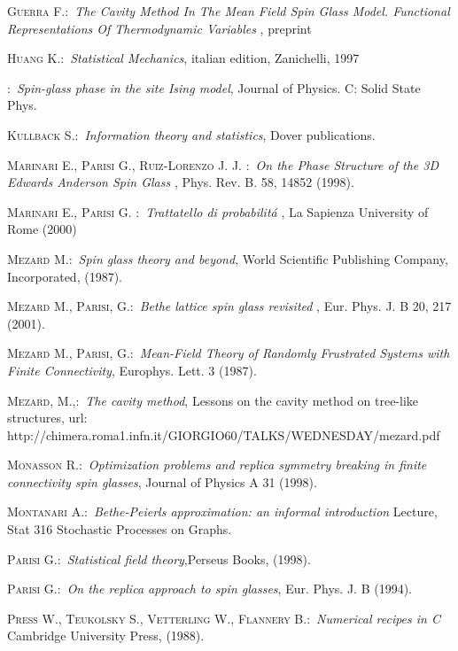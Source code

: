  \textsc{Guerra F.}:\ \textit{The Cavity Method In The Mean Field Spin Glass Model. Functional Representations Of Thermodynamic Variables }, preprint

 \textsc{Huang K.}:\ \textit{Statistical Mechanics}, italian edition, Zanichelli, 1997

:\ \textit{Spin-glass phase in the site Ising model}, Journal of Physics. C: Solid State Phys.

 \textsc{Kullback S.}:\ \textit{Information theory and statistics}, Dover publications.

 \textsc{Marinari E., Parisi G., Ruiz-Lorenzo J. J.} :\ \textit{On the Phase Structure of the 3D Edwards Anderson Spin Glass
} , Phys. Rev. B. 58, 14852 (1998).

 \textsc{Marinari E., Parisi G.} :\ \textit{Trattatello di probabilit\'a} , La Sapienza University of Rome (2000)

 \textsc{Mezard M.}:\ \textit{Spin glass theory and beyond}, World Scientific Publishing Company, Incorporated, (1987).

\textsc{Mezard M., Parisi, G.}:\ \textit{Bethe lattice spin glass revisited} , Eur. Phys. J. B 20, 217 (2001).

\textsc{Mezard M., Parisi, G.}:\ \textit{Mean-Field Theory of Randomly Frustrated Systems with Finite Connectivity},  Europhys. Lett. 3 (1987).

 \textsc{Mezard, M.,}:\ \textit{The cavity method}, Lessons on the cavity method on tree-like structures,
url: http://chimera.roma1.infn.it/GIORGIO60/TALKS/WEDNESDAY/mezard.pdf

\textsc{Monasson R.}:\ \textit{Optimization problems and replica symmetry breaking in finite connectivity spin glasses}, Journal of Physics A  31 (1998).

 \textsc{Montanari A.}:\ \textit{Bethe-Peierls approximation: an informal introduction} Lecture, Stat 316 Stochastic Processes on Graphs.

 \textsc{Parisi G.}:\ \textit{Statistical field theory},Perseus Books, (1998).

 \textsc{Parisi G.}:\ \textit{On the replica approach to spin glasses}, Eur. Phys. J. B (1994).

  \textsc{Press W., Teukolsky S., Vetterling W., Flannery B.}:\ \textit{Numerical recipes in C} Cambridge University Press, (1988).

